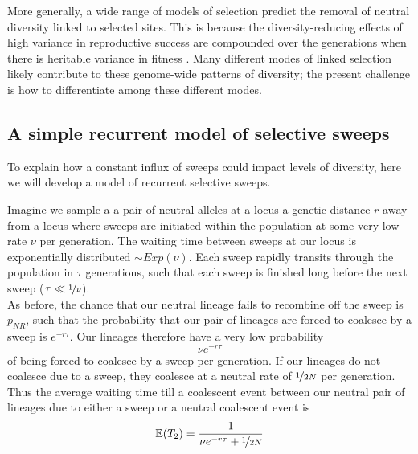 More generally, a wide range of models of selection predict the removal of neutral
diversity linked to selected sites. This is because the diversity-reducing effects of high variance in reproductive success are compounded over the generations when there is heritable variance in fitness 
\citep{Robertson:61,Santiago:95,Santiago:98,Barton:00}.  Many
different modes of linked selection likely contribute to these
genome-wide patterns of diversity; the present challenge is how to
differentiate among these different modes.


\subsection{A simple recurrent model of selective sweeps}
To explain how a constant influx of sweeps could impact levels of
diversity, here we will develop a model of recurrent
selective sweeps.

Imagine we sample a a pair of neutral alleles at a locus a genetic distance $r$ away from a locus where
sweeps are initiated within the population at some very low rate $\nu$
per generation. The waiting time between sweeps
at our locus is exponentially distributed $\sim Exp(\nu)$. Each sweep rapidly transits through the population in $\tau$
generations, such that each sweep is finished long before the next
sweep ($\tau \ll \nicefrac{1}{\nu}$). \\

As before, the chance that our neutral lineage fails to recombine
off the sweep is $p_{NR}$, such that the probability that
our pair of lineages are forced to coalesce by a sweep is $e^{-r \tau}$. Our
lineages therefore have a very low probability
\begin{equation}
\nu e^{-r \tau}
\end{equation}
of being forced to coalesce by a sweep per generation. If our lineages do not coalesce due to a sweep, they coalesce at a neutral rate of $\nicefrac{1}{2N}$ per generation. Thus the average
waiting time till a coalescent event between our neutral pair of
lineages due to either a sweep or a neutral coalescent event is
\begin{equation}
\mathbb{E}(T_2) = \frac{1}{\nu e^{-r \tau} + \nicefrac{1}{2N}}
\end{equation}

